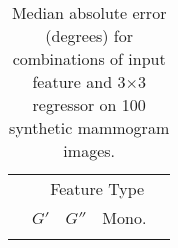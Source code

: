 \begin{table}[t]
\centering
\begin{tabular}{l c c c c}
\toprule
							& \multicolumn{4}{c}{Feature Type} \\
							& $G'$		& $G''$	& Mono.				& \dtcwt \\
\cmidrule{2-5}

\bottomrule
\noalign{\smallskip}
\end{tabular}
%
\caption{Median absolute error (degrees) for combinations of input feature and {3{$\times$}3} regressor on 100 synthetic mammogram images.}
\label{t:synth_mammography}
\end{table}